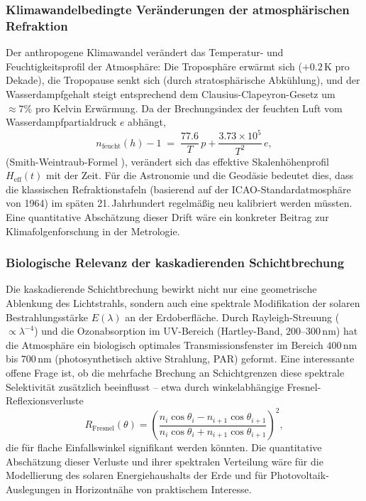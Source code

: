 \documentclass[12pt,a4paper]{article}
\providecommand{\SI}[2]{\ensuremath{#1\,#2}}
\providecommand{\nano}{\mathrm{n}}
\providecommand{\metre}{\mathrm{m}}
\providecommand{\kelvin}{\mathrm{K}}
\begin{document}
\subsubsection{Klimawandelbedingte Veränderungen der atmosphärischen Refraktion}

Der anthropogene Klimawandel verändert das Temperatur- und
Feuchtigkeitsprofil der Atmosphäre:
Die Troposphäre erwärmt sich ($+\SI{0.2}{\kelvin}$ pro Dekade),
die Tropopause senkt sich (durch stratosphärische Abkühlung),
und der Wasserdampfgehalt steigt entsprechend dem
Clausius-Clapeyron-Gesetz um $\approx 7\%$ pro Kelvin
Erwärmung.
Da der Brechungsindex der feuchten Luft vom Wasserdampfpartialdruck $e$
abhängt,
\begin{equation}
  n_{\mathrm{feucht}}(h) - 1
  \;=\; \frac{77.6}{T}\,p + \frac{3.73\times10^5}{T^2}\,e,
  \label{eq:n_feucht}
\end{equation}
(Smith-Weintraub-Formel \citep{SmithWeintraub1953}),
verändert sich das effektive Skalenhöhenprofil $H_{\mathrm{eff}}(t)$
mit der Zeit.
Für die Astronomie und die Geodäsie bedeutet dies, dass die
klassischen Refraktionstafeln (basierend auf der
ICAO-Standardatmosphäre von 1964) im späten 21.\,Jahrhundert
regelmäßig neu kalibriert werden müssten.
Eine quantitative Abschätzung dieser Drift wäre ein konkreter
Beitrag zur Klimafolgenforschung in der Metrologie.

\subsubsection{Biologische Relevanz der kaskadierenden Schichtbrechung}

Die kaskadierende Schichtbrechung bewirkt nicht nur eine geometrische
Ablenkung des Lichtstrahls, sondern auch eine spektrale Modifikation
der solaren Bestrahlungsstärke $E(\lambda)$ an der Erdoberfläche.
Durch Rayleigh-Streuung ($ \propto \lambda^{-4}$) und die Ozonabsorption
im UV-Bereich (Hartley-Band, $200\text{--}\SI{300}{\nano\metre}$)
hat die Atmosphäre ein biologisch optimales Transmissionsfenster
im Bereich $\SI{400}{\nano\metre}$ bis $\SI{700}{\nano\metre}$
(photosynthetisch aktive Strahlung, PAR) geformt.
Eine interessante offene Frage ist, ob die mehrfache Brechung an
Schichtgrenzen diese spektrale Selektivität zusätzlich beeinflusst --
etwa durch winkelabhängige Fresnel-Reflexionsverluste
\begin{equation}
  R_{\mathrm{Fresnel}}(\theta) =
  \left(\frac{n_i \cos\theta_i - n_{i+1}\cos\theta_{i+1}}
             {n_i \cos\theta_i + n_{i+1}\cos\theta_{i+1}}\right)^2,
  \label{eq:fresnel}
\end{equation}
die für flache Einfallswinkel signifikant werden könnten.
Die quantitative Abschätzung dieser Verluste und ihrer spektralen
Verteilung wäre für die Modellierung des solaren Energiehaushalts
der Erde und für Photovoltaik-Auslegungen in Horizontnähe von
praktischem Interesse.
\end{document}
